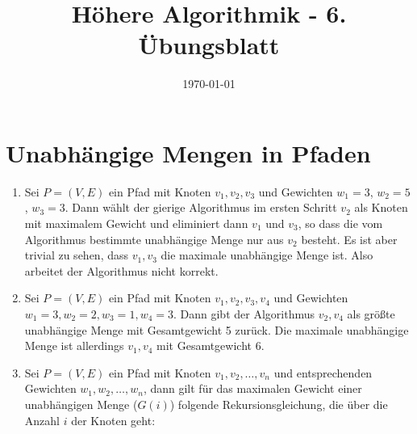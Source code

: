\documentclass[a4paper,10pt]{scrartcl}
\title{H\"ohere Algorithmik - 6. \"Ubungsblatt}
\author{\Authors}
\date{\today}
\begin{document}
\maketitle

\section{Unabhängige Mengen in Pfaden}
\begin{enumerate}
 \item Sei $P = (V,E)$ ein Pfad mit Knoten $v_1, v_2, v_3$ und Gewichten
 $w_1 = 3$, $w_2 = 5$, $w_3 = 3$. Dann wählt der gierige Algorithmus im
 ersten Schritt $v_2$ als Knoten mit maximalem Gewicht und eliminiert
 dann $v_1$ und $v_3$, so dass die vom Algorithmus bestimmte unabhängige
 Menge nur aus $v_2$ besteht. Es ist aber trivial zu sehen, dass ${v_1,v_3}$ die
 maximale unabhängige Menge ist. Also
 arbeitet der Algorithmus nicht korrekt.
 \item Sei $P = (V,E)$ ein Pfad mit Knoten $v_1, v_2, v_3, v_4$ und
 Gewichten $w_1 = 3, w_2 = 2, w_3 = 1, w_4 = 3$. Dann gibt der
 Algorithmus ${v_2,v_4}$ als größte unabhängige Menge mit Gesamtgewicht
 5 zurück. Die maximale unabhängige Menge ist allerdings ${v_1,v_4}$ mit
 Gesamtgewicht 6.
 \item Sei $P = (V,E)$ ein Pfad mit Knoten $v_1, v_2, \hdots, v_n$ und entsprechenden Gewichten $w_1, w_2, \hdots, w_n$, dann gilt für das
  maximalen Gewicht einer unabhängigen Menge ($G(i)$) folgende Rekursionsgleichung, die über die Anzahl $i$ der Knoten geht:


\end{enumerate}
\end{document}
